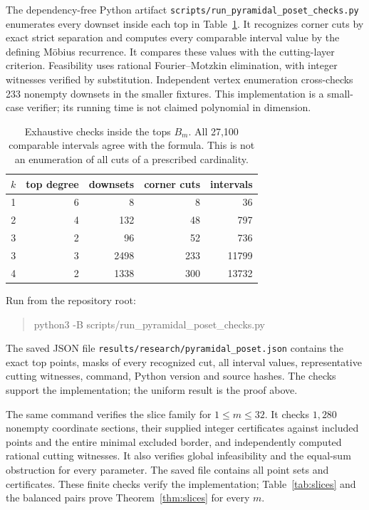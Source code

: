 \documentclass[11pt]{article}
\theoremstyle{remark}
\begin{document}
The dependency-free Python artifact
\texttt{scripts/run\_pyramidal\_poset\_checks.py} enumerates every downset
inside each top in Table~\ref{tab:checks}. It recognizes corner cuts by
exact strict separation and computes every comparable interval value by
the defining M\"obius recurrence. It compares these values with the
cutting-layer criterion. Feasibility uses rational Fourier--Motzkin
elimination, with integer witnesses verified by substitution. Independent
vertex enumeration cross-checks 233 nonempty downsets in the smaller
fixtures. This implementation is a small-case verifier; its running time
is not claimed polynomial in dimension.

\begin{table}[ht]
\centering
\begin{tabular}{rrrrr}
\toprule
$k$ & top degree & downsets & corner cuts & intervals\\
\midrule
1&6&8&8&36\\
2&4&132&48&797\\
3&2&96&52&736\\
3&3&2498&233&11799\\
4&2&1338&300&13732\\
\bottomrule
\end{tabular}
\caption{Exhaustive checks inside the tops $B_m$. All 27,100 comparable
intervals agree with the formula. This is not an enumeration of all cuts
of a prescribed cardinality.}\label{tab:checks}
\end{table}

Run from the repository root:
\begin{quote}\ttfamily\small
python3 -B scripts/run\_pyramidal\_poset\_checks.py
\end{quote}
The saved JSON file \texttt{results/research/pyramidal\_poset.json}
contains the exact top points, masks of every recognized cut, all interval
values, representative cutting witnesses, command, Python version and
source hashes. The checks support the implementation; the uniform result
is the proof above.

The same command verifies the slice family for $1\leq m\leq32$.
It checks $1,280$ nonempty coordinate sections, their supplied integer
certificates against included points and the entire minimal excluded border,
and independently computed rational cutting witnesses. It also verifies
global infeasibility and the equal-sum obstruction for every parameter.
The saved file contains all point sets and certificates. These finite checks
verify the implementation; Table~\ref{tab:slices} and the balanced pairs
prove Theorem~\ref{thm:slices} for every $m$.
\end{document}
